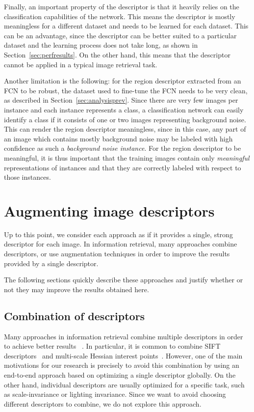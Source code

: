 Finally, an important property of the descriptor is that it
heavily relies on the classification
capabilities of the network. This means the descriptor is
mostly meaningless for a different dataset and needs
to be learned for each dataset. This can be an advantage,
since the descriptor can be better suited to a particular
dataset and the learning process does not take long, as shown
in Section~\ref{sec:perfresults}. On the other hand, this means that
the descriptor cannot be applied in a typical image retrieval
task.

Another limitation is the following: for the region descriptor extracted from
an FCN to be robust, the dataset used to fine-tune the FCN needs to be
very clean, as described in Section~\ref{sec:analysisprev}. Since there
are very few images per instance and each instance represents a class,
a classification network can easily identify a class if it consists
of one or two images representing background noise. This can render
the region descriptor meaningless, since in this case, any part of an image
which contains mostly background noise may be labeled with high confidence
as such a \emph{background noise instance}. For the region descriptor to be
meaningful, it is thus important that the training images contain only
\emph{meaningful} representations of instances and that they are
correctly labeled with respect to those instances.

\section{Augmenting image descriptors}\label{sec:improvedesc}
Up to this point, we consider each approach
as if it provides a single, strong descriptor for each image.
In information retrieval, many approaches combine descriptors,
or use augmentation techniques in order to improve the results
provided by a single descriptor.

The following sections quickly describe these approaches and
justify whether or not they may improve the results obtained
here.

\subsection{Combination of descriptors}
Many approaches in information retrieval combine multiple
descriptors in order to achieve better results
~\cite{philbin_lost_2008,jegou_accurate_2010,chum_total_2007}.
In particular,
it is common to combine SIFT descriptors~\cite{lowe_distinctive_2004}
and multi-scale Hessian interest points~\cite{mikolajczyk_scale_2004}.
However, one of the main motivations for our research is precisely to avoid
this combination by using an end-to-end approach based
on optimizing a single descriptor globally. On the other hand,
individual descriptors are usually optimized for
a specific task, such as scale-invariance or lighting invariance.
Since we want to avoid choosing
different descriptors to combine, we do not explore this approach.

